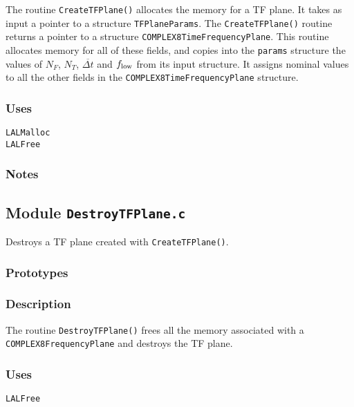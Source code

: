 The routine \verb+CreateTFPlane()+ allocates the memory for a TF plane.  It
takes as input a pointer to a structure \verb+TFPlaneParams+.  The
\verb+CreateTFPlane()+ routine returns a pointer to a structure
\verb+COMPLEX8TimeFrequencyPlane+.    This routine allocates memory for all of
these fields, and copies into the \verb+params+ structure the values of $N_F$,
$N_T$, ${\overline {\Delta t}}$ and $f_{\rm low}$ from its input structure.
It assigns nominal values to all the other fields in the
\verb+COMPLEX8TimeFrequencyPlane+ structure. 

\subsubsection*{Uses}
\begin{verbatim}
LALMalloc
LALFree
\end{verbatim}

\subsubsection*{Notes}

\vfill{\footnotesize}

\newpage
\subsection{Module \texttt{DestroyTFPlane.c}}
\label{ss:DestroyTFPlane.c}

Destroys a TF plane created with \texttt{CreateTFPlane()}.

\subsubsection*{Prototypes}
\vspace{0.1in}


\subsubsection*{Description}

The routine \verb+DestroyTFPlane()+ frees all the memory associated with a
\verb+COMPLEX8FrequencyPlane+ and destroys the TF plane.

\subsubsection*{Uses}
\begin{verbatim}
LALFree
\end{verbatim}


